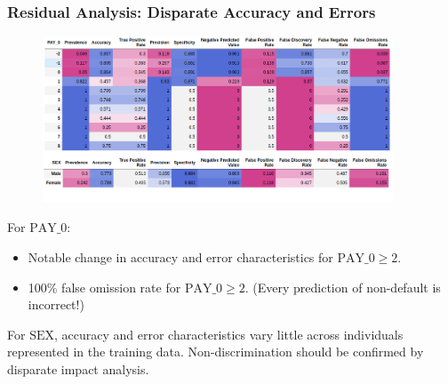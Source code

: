 \documentclass[11pt,
               aspectratio=43,
               hyperref={colorlinks}
               ]{beamer}
\begin{document}
			\begin{frame}[t]
		
				\frametitle{\textbf{Residual Analysis}: Disparate Accuracy and Errors}
		
		                 \vspace{-10pt}
				\begin{figure}
					\begin{center}
						\includegraphics[height=140pt]{img/de.png}
					\end{center}
				\end{figure}
				\vspace{-15pt}
				\tiny For $\text{PAY\_0}$:
				\begin{itemize}
					\item Notable change in accuracy and error characteristics for $\text{PAY\_0} \geq 2$. 
					\item 100\% false omission rate for $\text{PAY\_0} \geq 2$. (Every prediction of non-default is incorrect!)
				\end{itemize}
				For $\text{SEX}$, accuracy and error characteristics vary little across individuals represented in the training data. Non-discrimination should be confirmed by disparate impact analysis.
		
			\end{frame}
\end{document}

